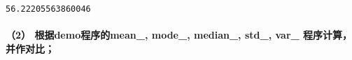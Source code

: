 \documentclass[11pt]{article}
\makeatletter
\newcommand{\boxspacing}{\kern\kvtcb@left@rule\kern\kvtcb@boxsep}
\newcommand{\prompt}[4]{
        \ttfamily\llap{{\color{#2}[#3]:\hspace{3pt}#4}}\vspace{-\baselineskip}
    }
\makeatother
\begin{document}
            \begin{tcolorbox}[breakable, size=fbox, boxrule=.5pt, pad at break*=1mm, opacityfill=0]
\prompt{Out}{outcolor}{140}{\boxspacing}
\begin{Verbatim}[commandchars=\\\{\}]
56.22205563860046
\end{Verbatim}
\end{tcolorbox}
        
    \hypertarget{ux6839ux636edemoux7a0bux5e8fux7684mean_-mode_-median_-std_-var_-ux7a0bux5e8fux8ba1ux7b97ux5e76ux4f5cux5bf9ux6bd4}{%
\paragraph{（2） 根据demo程序的mean\_, mode\_, median\_, std\_, var\_
程序计算，并作对比；}\label{ux6839ux636edemoux7a0bux5e8fux7684mean_-mode_-median_-std_-var_-ux7a0bux5e8fux8ba1ux7b97ux5e76ux4f5cux5bf9ux6bd4}}
\end{document}
